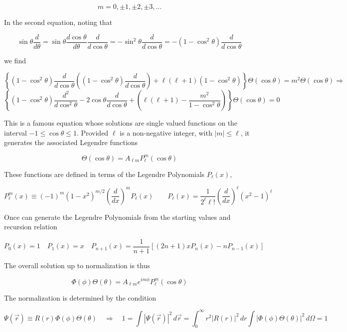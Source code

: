 \[
m = 0, \pm 1, \pm 2,\pm 3, \hdots
\] \vspace{3px}

In the second equation, noting that 

\[
\sin\theta \frac{d }{d \theta}  = \sin\theta \frac{d \cos\theta}{d \theta}
\frac{d }{d \cos\theta} = -\sin^2 \theta \frac{d }{d \cos\theta}
= -(1-\cos^2\theta) \frac{d }{d \cos\theta}  
\] \vspace{3px}

we find 

\[
\left\{ (1 - \cos^2 \theta) \frac{d}{d \cos \theta} \left( (1 - \cos^2 \theta)
\frac{d}{d \cos \theta} \right) + \ell(\ell + 1)(1 - \cos^2 \theta) \right\}
\Theta(\cos \theta) = m^2 \Theta(\cos \theta) \Rightarrow
\]
\[
\left\{ (1 - \cos^2 \theta) \frac{d^2}{d \cos^2 \theta} - 2 \cos \theta \frac{d}{d \cos \theta} + \left( \ell(\ell + 1) - \frac{m^2}{1 - \cos^2 \theta} \right) \right\} \Theta(\cos \theta) = 0
\]




This is a famous equation whose solutions are single valued functions on the
interval $-1 \leq \cos \theta \leq 1$. Provided  $\ell$ is a non-negative
integer, with $|m| \leq \ell$, it generates the associated Legendre functions 

\[
  \Theta(\cos \theta) = A_{\ell m} P_\ell^m (\cos\theta) 
\] \vspace{3px}

These functions are defined in terms of the Legendre Polynomials $P_\ell(x)$, 

\[
P_\ell^m (x) \equiv (-1)^{m} (1-x^2)^{m/2} \left( \frac{d }{d x}  \right)^{m}
P_\ell (x) \qquad P_\ell(x) = \frac{1}{2^{\ell} \ell!} \left( \frac{d }{d x}
\right)^{\ell} (x^2 - 1)^{\ell}  
\] \vspace{3px}

Once can generate the Legendre Polynomials from the starting values and
recursion relation 

\[
  P_0(x) = 1 \quad P_1(x) = x \quad P_{n+1} (x) = \frac{1}{n+1} [(2n + 1)x
  P_n(x) - nP_{n-1} (x) ]
\] \vspace{3px}

The overall solution up to normalization is thus 

\[
  \Phi(\phi)\Theta(\theta) = A_{\ell m} e^{im\phi} P_\ell^{m} (\cos\theta)
\] \vspace{3px}

The normalization is determined by the condition 

\[
\Psi(\vec{r}) \equiv R(r)\Phi(\phi)\Theta(\theta) \quad \Rightarrow \quad
1 = \int |\Psi(\vec{r})|^2 \, d\vec{r} = \int_{0}^{\infty} r^2 |R(r)|^2 \, dr
  \int |\Phi(\phi)\Theta(\theta)|^2 \, d\Omega = 1
\] \vspace{3px}

